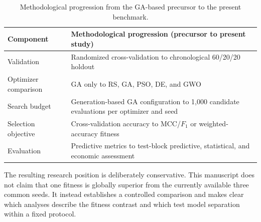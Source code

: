 \begin{table}[htbp]
\centering
\caption{Methodological progression from the GA-based precursor to the present benchmark.}
\label{tab:precursor_extension}
\manuscripttablestyle
\begin{tabularx}{\linewidth}{@{}L L@{}}
\toprule
Component & Methodological progression (precursor to present study) \\
\midrule
Validation & Randomized cross-validation to chronological 60/20/20 holdout \\
Optimizer comparison & GA only to RS, GA, PSO, DE, and GWO \\
Search budget & Generation-based GA configuration to 1,000 candidate evaluations per optimizer and seed \\
Selection objective & Cross-validation accuracy to MCC/$F_1$ or weighted-accuracy fitness \\
Evaluation & Predictive metrics to test-block predictive, statistical, and economic assessment \\
\bottomrule
\end{tabularx}
\end{table}

The resulting research position is deliberately conservative. This manuscript does not claim that one fitness is globally superior from the currently available three common seeds. It instead establishes a controlled comparison and makes clear which analyses describe the fitness contrast and which test model separation within a fixed protocol.
